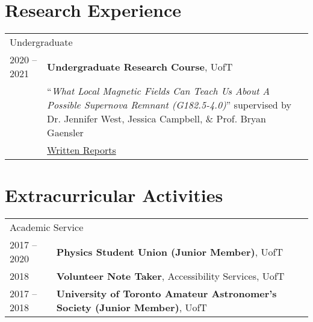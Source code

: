 \documentclass[10pt]{res} %
\begin{document}
\begin{resume}
\section{\Large Research Experience}
\vspace{-5pt} %
\noindent\makebox[\linewidth]{\rule{\textwidth}{0.4pt}}
\vspace{-20pt} %

\begin{table}[h!]
\begin{tabularx}{\textwidth}{ @{} p{6.5em} X @{} }
\multicolumn{2}{l}{ \rule{0pt}{3ex} \large \hspace{-12pt} Undergraduate \dotfill \rule[-1.2ex]{0pt}{0pt}} \\ 
2020 -- 2021 & \textbf{Undergraduate Research Course}, UofT \\
                     & ``\textit{What Local Magnetic Fields Can Teach Us About A Possible Supernova Remnant (G182.5-4.0)}'' supervised by Dr. Jennifer West, Jessica Campbell, $\&$ Prof. Bryan Gaensler \\
                     & \href{https://github.com/parampreetastro/AST425}{Written Reports}
\end{tabularx}
\end{table}



\section{\Large Extracurricular Activities}
\vspace{-5pt} %
\noindent\makebox[\linewidth]{\rule{\textwidth}{0.4pt}}
\vspace{-20pt} %

\begin{table}[h]
\begin{tabularx}{\textwidth}{ @{} p{6.5em} X @{} }

\multicolumn{2}{l}{ \rule{0pt}{3ex} \large \hspace{-12pt} Academic Service \dotfill \rule[-1.2ex]{0pt}{0pt}} \\ 
2017 -- 2020 & \textbf{Physics Student Union (Junior Member)}, UofT \\
2018 & \textbf{Volunteer Note Taker}, Accessibility Services, UofT \\
2017 -- 2018 & \textbf{University of Toronto Amateur Astronomer's Society (Junior Member)}, UofT \\


\end{tabularx}
\end{table}
\end{resume}
\end{document}
